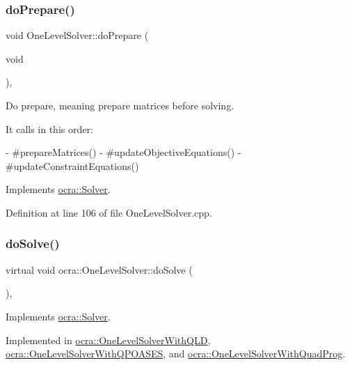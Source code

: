 \subsubsection{\texorpdfstring{do\+Prepare()}{doPrepare()}}
{\footnotesize\ttfamily void One\+Level\+Solver\+::do\+Prepare (\begin{DoxyParamCaption}\item[{void}]{ }\end{DoxyParamCaption})\hspace{0.3cm}{\ttfamily [protected]}, {\ttfamily [virtual]}}

Do prepare, meaning prepare matrices before solving.

It calls in this order\+: \begin{DoxyVerb} - #prepareMatrices()
 - #updateObjectiveEquations()
 - #updateConstraintEquations()\end{DoxyVerb}
 

Implements \hyperlink{classocra_1_1Solver_a9ab90e87025e3da7239141c48d28ab4a}{ocra\+::\+Solver}.



Definition at line 106 of file One\+Level\+Solver.\+cpp.

\hypertarget{classocra_1_1OneLevelSolver_aeb4fb349df382921c5c0064d7a05c48b}{}\label{classocra_1_1OneLevelSolver_aeb4fb349df382921c5c0064d7a05c48b} 
\subsubsection{\texorpdfstring{do\+Solve()}{doSolve()}}
{\footnotesize\ttfamily virtual void ocra\+::\+One\+Level\+Solver\+::do\+Solve (\begin{DoxyParamCaption}{ }\end{DoxyParamCaption})\hspace{0.3cm}{\ttfamily [protected]}, {}}



Implements \hyperlink{classocra_1_1Solver_ace2d7cfe741611de6dc87a0de7e7f3a9}{ocra\+::\+Solver}.



Implemented in \hyperlink{classocra_1_1OneLevelSolverWithQLD_ac7cce5bd375142ca0c74cd71300b15a5}{ocra\+::\+One\+Level\+Solver\+With\+Q\+LD}, \hyperlink{classocra_1_1OneLevelSolverWithQPOASES_aa2d1343a6e0f5c8913496c3384c0cd40}{ocra\+::\+One\+Level\+Solver\+With\+Q\+P\+O\+A\+S\+ES}, and \hyperlink{classocra_1_1OneLevelSolverWithQuadProg_aa6e7517459ef68106e83a7f0dc09c977}{ocra\+::\+One\+Level\+Solver\+With\+Quad\+Prog}.

